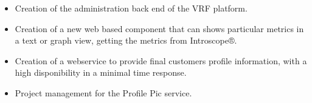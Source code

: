\documentclass[10pt,a4paper]{altacv}
\begin{document}
\begin{itemize}
\item Creation of the administration back end of the VRF platform. 
\end{itemize}
\divider

\begin{itemize}
\item Creation of a new web based component that can shows particular metrics in a text or graph view, getting the metrics from Introscope®.
\end{itemize}
\divider

\begin{itemize}
\item Creation of a webservice to provide final customers profile information, with a high disponibility in a minimal time response.
\item Project management for the Profile Pic service.
\end{itemize}
\divider











\end{document}
